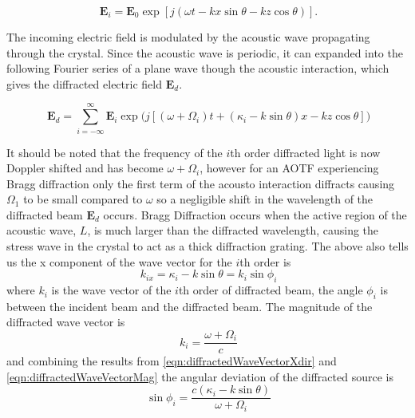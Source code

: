 \begin{equation}
    \ \mathbf{E}_{i} = \mathbf{E}_{0}\exp[j(\omega t-kx\sin \theta - kz \cos \theta)].
    \label{eqn:planeWaveEField}
\end{equation}


The incoming electric field is modulated by the acoustic wave propagating through the crystal. Since the acoustic wave is periodic, it can expanded into the following Fourier series of a plane wave though the acoustic interaction, which gives the diffracted electric field $\mathbf{E}_{d}$.

\begin{equation}
    \ \mathbf{E}_{d} = \sum_{i=-\infty}^{\infty}\mathbf{E}_{i}\exp{(j[(\omega+\Omega_{i})t+(\kappa_{i}-k\sin\theta)x-kz\cos\theta]})
    \label{eqn:modulatedEField}
\end{equation}

It should be noted that the frequency of the $i$th order diffracted light is now Doppler shifted and has become $\omega+\Omega_{i}$, however for an AOTF experiencing Bragg diffraction only the first term of the acousto interaction diffracts causing $\Omega_{1}$ to be small compared to $\omega$ so a negligible shift in the wavelength of the diffracted beam $\mathbf{E}_{d}$ occurs. Bragg Diffraction occurs when the active region of the acoustic wave, $L$, is much larger than the diffracted wavelength, causing the stress wave in the crystal to act as a thick diffraction grating. The above also tells us the x component of the wave vector for the $i$th order is
\begin{equation}
    \ k_{ix} = \kappa_{i}-k\sin\theta = k_{i}\sin\phi_{i}
    \label{eqn:diffractedWaveVectorXdir}
\end{equation}
where $k_{i}$ is the wave vector of the $i$th order of diffracted beam, the angle $\phi_{i}$ is between the incident beam and the diffracted beam.  The magnitude of the diffracted wave vector is
\begin{equation}
    \ k_{i} = \frac{\omega+\Omega_{i}}{c}
    \label{eqn:diffractedWaveVectorMag}
\end{equation}
and combining the results from \autoref{eqn:diffractedWaveVectorXdir} and \autoref{eqn:diffractedWaveVectorMag} the angular deviation of the diffracted source is
\begin{equation}
    \ \sin\phi_{i} = \frac{c(\kappa_{i}-k\sin\theta)}{\omega+\Omega_{i}}
    \label{eqn:diffractedWaveVectroAngulareDeflection}
\end{equation}

